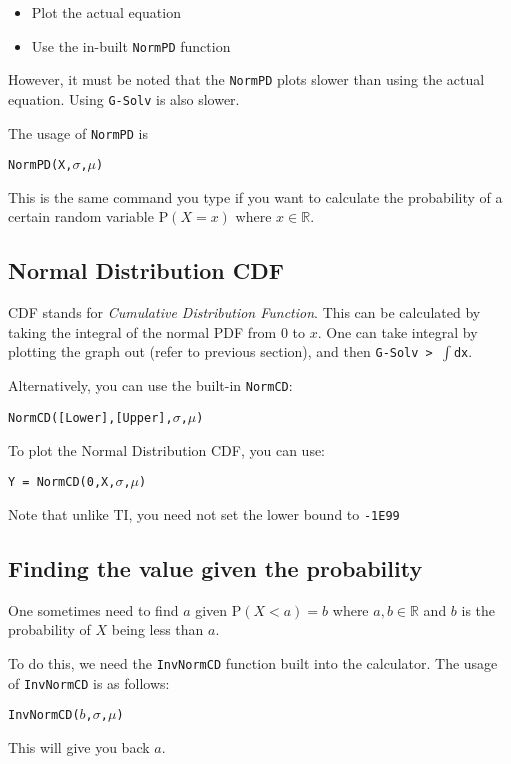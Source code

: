 \documentclass[a5paper]{memoir}
\def\code#1{\texttt{#1}}
\newcommand{\addtoindex}[1]{#1\index{#1}}
\begin{document}
\begin{itemize}
	\item Plot the actual equation
	\item Use the in-built \code{NormPD} function
\end{itemize}

However, it must be noted that the \code{NormPD} plots slower than using the actual equation. Using \code{G-Solv} is also slower.

The usage of \code{\addtoindex{NormPD}} is 
\begin{center}
	\code{NormPD(X,$\sigma$,$\mu$)}
\end{center}

This is the same command you type if you want to calculate the probability of a certain random variable $\textrm{P}(X = x)$ where $x \in \mathbb{R}$.

\subsection{Normal Distribution CDF}
CDF stands for \textit{Cumulative Distribution Function}. This can be calculated by taking the integral of the normal PDF from 0 to $x$. One can take integral by plotting the graph out (refer to previous section), and then \code{G-Solv > $\int$dx}.

Alternatively, you can use the built-in \code{\addtoindex{NormCD}}:
\begin{center}
	\code{NormCD([Lower],[Upper],$\sigma$,$\mu$)}
\end{center}

To plot the Normal Distribution CDF, you can use:
\begin{center}
	\code{Y = NormCD(0,X,$\sigma$,$\mu$)}
\end{center}

Note that unlike TI, you need not set the lower bound to \code{-1E99}

\subsection{Finding the value given the probability}
One sometimes need to find $a$ given $\textrm{P}(X < a) = b$ where $a,b \in \mathbb{R}$ and $b$ is the probability of $X$ being less than $a$. 

To do this, we need the \code{\addtoindex{InvNormCD}} function built into the calculator. The usage of \code{InvNormCD} is as follows:
\begin{center}
	\code{InvNormCD($b$,$\sigma$,$\mu$)}
\end{center}

This will give you back $a$.

\printindex
\end{document}
